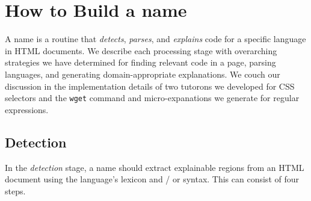 \begin{figure}
\end{figure}

\section{How to Build a \Gls{name}}

A \gls{name} is a routine that \emph{detects}, \emph{parses}, and \emph{explains} code for a specific language in HTML documents.
We describe each processing stage with overarching strategies we have determined for finding relevant code in a page, parsing languages, and generating domain-appropriate explanations.
We couch our discussion in the implementation details of two tutorons we developed for CSS selectors and the \texttt{wget} command and micro-expanations we generate for regular expressions.

\subsection{Detection}
In the \emph{detection} stage, a \gls{name} should extract explainable regions from an HTML document using the language's lexicon and / or syntax.
This can consist of four steps.

